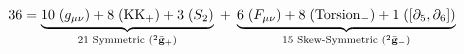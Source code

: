 \documentclass[preview]{standalone}
\begin{document}
\begin{align*}
\special{dvisvgm:raw <g id='unique000'>}36 = \underbrace{10\;(g_{\mu\nu}) + 8\;(\text{KK}_+) + 3\;(S_2)}_{21\text{ Symmetric }({}^2\bar{\mathbf{g}}_+)} \;+\; \underbrace{6\;(F_{\mu\nu}) + 8\;(\text{Torsion}_-) + 1\;([\partial_5,\partial_6])}_{15\text{ Skew-Symmetric }({}^2\bar{\mathbf{g}}_-)}\special{dvisvgm:raw </g>}
\end{align*}
\end{document}
